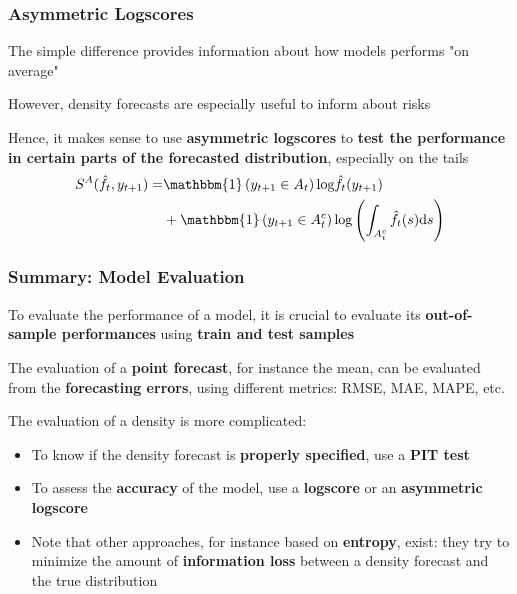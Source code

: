 \documentclass{beamer}
\newenvironment{wideitemize}{\itemize\addtolength{\itemsep}{10pt}}{\enditemize}
\begin{document}
\begin{frame}
  \frametitle{Asymmetric Logscores}
  \begin{wideitemize}
    \item The simple difference provides information about how models performs "on average"
    \item However, density forecasts are especially useful to inform about risks 
    \item Hence, it makes sense to use \textbf{asymmetric logscores} to \textbf{test the performance in certain parts of the forecasted distribution}, especially on the tails
      \begin{equation*}
        \begin{split}
          S^{A}(\hat{f}_t, y_{t+1}) = & \mathbbm{1}\left(y_{t+1} \in A_t\right) \text{log}\hat{f}_t(y_{t+1}) \\
          & +  \mathbbm{1}\left(y_{t+1} \in A^c_t\right)\text{log}\left( \int_{A^c_t} \hat{f}_t(s) \text{d}s \right)
        \end{split}
      \end{equation*}
  \end{wideitemize}
\end{frame}

\begin{frame}
  \frametitle{Summary: Model Evaluation}
  \begin{wideitemize}
    \item To evaluate the performance of a model, it is crucial to evaluate its \textbf{out-of-sample performances} using \textbf{train and test samples}
    \item The evaluation of a \textbf{point forecast}, for instance the mean, can be evaluated from the \textbf{forecasting errors}, using different metrics: RMSE, MAE, MAPE, etc.
    \item The evaluation of a density is more complicated:
      \begin{itemize}
      \item To know if the density forecast is \textbf{properly specified}, use a \textbf{PIT test}
      \item To assess the \textbf{accuracy} of the model, use a \textbf{logscore} or an \textbf{asymmetric logscore}
      \item Note that other approaches, for instance based on \textbf{entropy}, exist: they try to minimize the amount of \textbf{information loss} between a density forecast and the true distribution
      \end{itemize}
  \end{wideitemize}

  
\end{frame}
\end{document}
